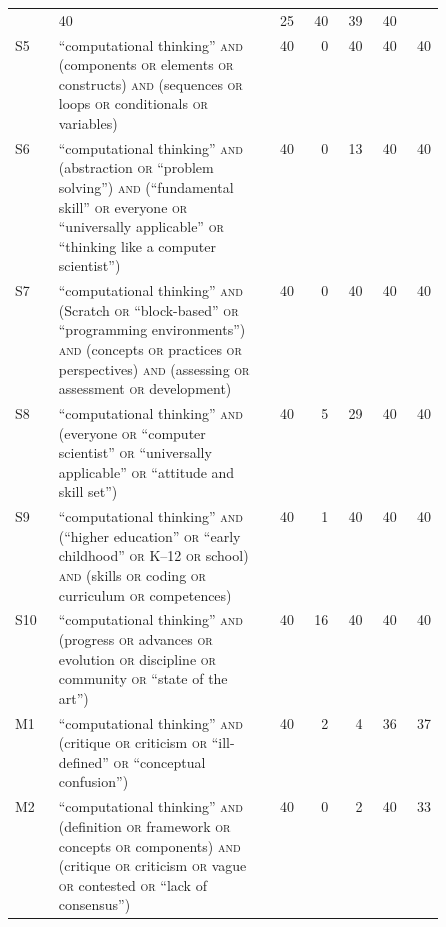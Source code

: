 \begin{table}[htbp]
\begin{sidecaption}
\begin{tabular}{@{}lp{0.5\linewidth}rrrrr@{}}
         & 40 & 25 & 40 & 39 & 40 \\
      S5 & \enquote{computational thinking} \textsc{and} (components \textsc{or} elements \textsc{or} constructs) \textsc{and} (sequences \textsc{or} loops \textsc{or} conditionals \textsc{or} variables)
         & 40 & 0 & 40 & 40 & 40 \\
      S6 & \enquote{computational thinking} \textsc{and} (abstraction \textsc{or} \enquote{problem solving}) \textsc{and} (\enquote{fundamental skill} \textsc{or} everyone \textsc{or} \enquote{universally applicable} \textsc{or} \enquote{thinking like a computer scientist})
         & 40 & 0 & 13 & 40 & 40 \\
      S7 & \enquote{computational thinking} \textsc{and} (Scratch \textsc{or} \enquote{block-based} \textsc{or} \enquote{programming environments}) \textsc{and} (concepts \textsc{or} practices \textsc{or} perspectives) \textsc{and} (assessing \textsc{or} assessment \textsc{or} development)
         & 40 & 0 & 40 & 40 & 40 \\
      S8 & \enquote{computational thinking} \textsc{and} (everyone \textsc{or} \enquote{computer scientist} \textsc{or} \enquote{universally applicable} \textsc{or} \enquote{attitude and skill set})
         & 40 & 5 & 29 & 40 & 40 \\
      S9 & \enquote{computational thinking} \textsc{and} (\enquote{higher education} \textsc{or} \enquote{early childhood} \textsc{or} K--12 \textsc{or} school) \textsc{and} (skills \textsc{or} coding \textsc{or} curriculum \textsc{or} competences)
         & 40 & 1 & 40 & 40 & 40 \\
      S10 & \enquote{computational thinking} \textsc{and} (progress \textsc{or} advances \textsc{or} evolution \textsc{or} discipline \textsc{or} community \textsc{or} \enquote{state of the art})
         & 40 & 16 & 40 & 40 & 40 \\
      \midrule
      M1 & \enquote{computational thinking} \textsc{and} (critique \textsc{or} criticism \textsc{or} \enquote{ill-defined} \textsc{or} \enquote{conceptual confusion})
         & 40 & 2 & 4 & 36 & 37 \\
      M2 & \enquote{computational thinking} \textsc{and} (definition \textsc{or} framework \textsc{or} concepts \textsc{or} components) \textsc{and} (critique \textsc{or} criticism \textsc{or} vague \textsc{or} contested \textsc{or} \enquote{lack of consensus})
         & 40 & 0 & 2 & 40 & 33 \\
      \bottomrule
    \end{tabular}
  \end{sidecaption}
\end{table}

